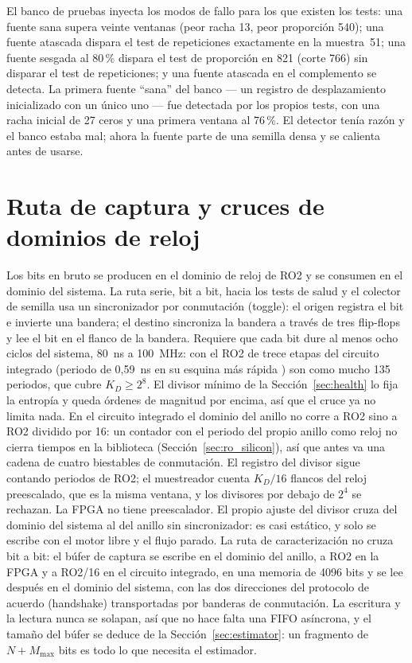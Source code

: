 El banco de pruebas inyecta los modos de fallo para los que existen los
tests: una fuente sana supera veinte ventanas (peor racha 13, peor
proporción 540); una fuente atascada dispara el test de repeticiones
exactamente en la muestra~51; una fuente sesgada al 80\,\% dispara el
test de proporción en 821 (corte 766) sin disparar el test de
repeticiones; y una
fuente atascada en el complemento se detecta. La primera fuente
``sana'' del banco --- un registro de desplazamiento inicializado con un
único uno --- fue detectada por los propios tests, con una racha inicial
de 27 ceros y una primera ventana al 76\,\%. El detector tenía razón y
el banco estaba mal; ahora la fuente parte de una semilla densa y se
calienta antes de usarse.

\section{Ruta de captura y cruces de dominios de reloj}
\label{sec:cdc}

Los bits en bruto se producen en el dominio de reloj de RO2 y se
consumen en el dominio del sistema. La ruta serie, bit a bit, hacia los
tests de salud y el colector de semilla usa un sincronizador por
conmutación (toggle): el origen registra el bit e invierte una bandera;
el destino sincroniza la bandera a través de tres flip-flops y lee el bit
en el flanco de la bandera. Requiere que cada bit dure al menos ocho
ciclos del sistema, 80~ns a 100~MHz: con el RO2 de trece etapas del
circuito integrado (periodo de 0,59~ns en su esquina más rápida
\simu{}) son como mucho 135 periodos, que cubre $K_D \ge 2^{8}$. El
divisor mínimo de la Sección~\ref{sec:health} lo fija la entropía y
queda órdenes de magnitud por encima, así que el cruce ya no limita
nada. En el circuito integrado el dominio del anillo no corre a RO2 sino
a RO2 dividido por 16: un contador con el periodo del propio anillo como
reloj no cierra tiempos en la biblioteca \est{}
(Sección~\ref{sec:ro_silicon}), así que antes va una cadena de cuatro
biestables de conmutación. El registro del divisor sigue contando
periodos de RO2; el muestreador cuenta $K_D/16$ flancos del reloj
preescalado, que es la misma ventana, y los divisores por debajo de
$2^{4}$ se rechazan. La \ac{FPGA} no tiene preescalador. El propio
ajuste del divisor cruza del dominio del sistema al del anillo sin
sincronizador: es casi estático, y solo se escribe con el motor libre y
el flujo parado. La ruta de
caracterización no cruza bit a bit: el búfer de
captura se escribe en el dominio del anillo, a RO2 en la \ac{FPGA} y a
RO2/16 en el circuito integrado, en una
memoria de 4096 bits y se lee después en el dominio del sistema, con las
dos direcciones del protocolo de acuerdo (handshake) transportadas por
banderas de conmutación. La escritura y la lectura nunca se solapan, así
que no hace falta una FIFO asíncrona, y el tamaño del búfer se deduce de
la Sección~\ref{sec:estimator}: un fragmento de $N + M_{\max}$ bits es
todo lo que necesita el estimador.

